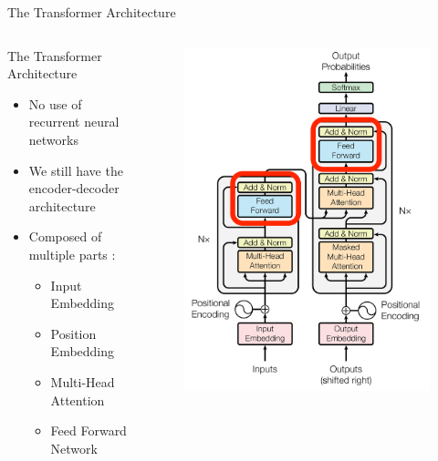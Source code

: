 \documentclass[aspectratio=169]{beamer}
\begin{document}
\begin{frame}{The Transformer Architecture}
\begin{columns}
\begin{column}{0.5\textwidth}
\centering
   The Transformer Architecture \cite{vaswani2017attention}

   \vspace{.5cm}
   
   \raggedright
   \begin{itemize}
   	\item No use of recurrent neural networks
	\item We still have the encoder-decoder architecture
	\item Composed of multiple parts :
	\begin{itemize}
		\item Input Embedding
		\item Position Embedding
		\item Multi-Head Attention
		\item Feed Forward Network
	\end{itemize}
   \end{itemize}
\end{column}
\begin{column}{0.5\textwidth}  %
    \begin{center}
    \vspace{-1.3cm}
    \begin{figure}
    \begin{overprint}
    	 \includegraphics[height=\paperheight]{figures/transformer_feedforward}

\end{overprint}
\end{figure}
\end{center}
\end{column}
\end{columns}
\end{frame}
\end{document}

